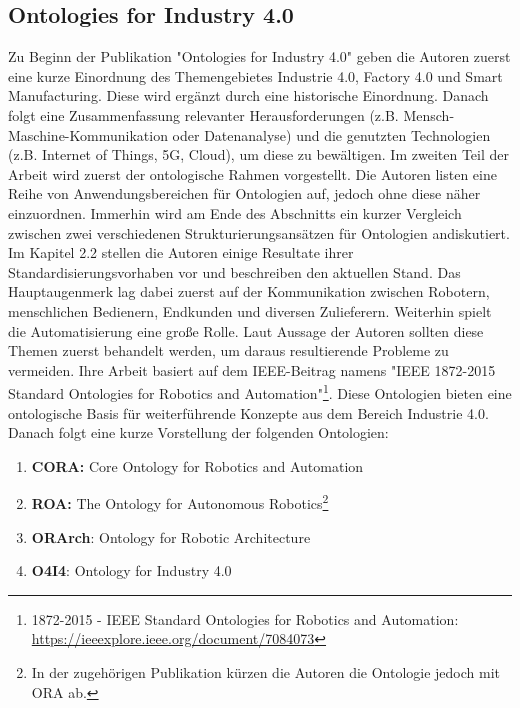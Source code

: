 \documentclass{article}
\begin{document}
\subsection{Ontologies for Industry 4.0}
%

Zu Beginn der Publikation "Ontologies for Industry 4.0" \cite{kumar2019ontologies} geben die Autoren zuerst eine kurze Einordnung des Themengebietes Industrie 4.0, Factory 4.0 und Smart Manufacturing.
Diese wird ergänzt durch eine historische Einordnung.
Danach folgt eine Zusammenfassung relevanter Herausforderungen (z.B. Mensch-Maschine-Kommunikation oder Datenanalyse) und die genutzten Technologien (z.B. Internet of Things, 5G, Cloud), um diese zu bewältigen.
Im zweiten Teil der Arbeit wird zuerst der ontologische Rahmen vorgestellt.
Die Autoren listen eine Reihe von Anwendungsbereichen für Ontologien auf, jedoch ohne diese näher einzuordnen.
Immerhin wird am Ende des Abschnitts ein kurzer Vergleich zwischen zwei verschiedenen Strukturierungsansätzen für Ontologien andiskutiert.
Im Kapitel 2.2 stellen die Autoren einige Resultate ihrer Standardisierungsvorhaben vor und beschreiben den aktuellen Stand.
Das Hauptaugenmerk lag dabei zuerst auf der Kommunikation zwischen Robotern, menschlichen Bedienern, Endkunden und diversen Zulieferern.
Weiterhin spielt die Automatisierung eine große Rolle.
Laut Aussage der Autoren sollten diese Themen zuerst behandelt werden, um daraus resultierende Probleme zu vermeiden.
Ihre Arbeit basiert auf dem IEEE-Beitrag namens "IEEE 1872-2015 Standard Ontologies for Robotics and Automation"\footnote{1872-2015 - IEEE Standard Ontologies for Robotics and Automation: \url{https://ieeexplore.ieee.org/document/7084073}}.
Diese Ontologien bieten eine ontologische Basis für weiterführende Konzepte aus dem Bereich Industrie 4.0.
Danach folgt eine kurze Vorstellung der folgenden Ontologien:
\begin{enumerate}
    \item \textbf{CORA:} Core Ontology for Robotics and Automation
    \item \textbf{ROA:} The Ontology for Autonomous Robotics\footnote{In der zugehörigen Publikation\cite{olszewska2017ontology} kürzen die Autoren die Ontologie jedoch mit ORA ab.}
    \item \textbf{ORArch}: Ontology for Robotic Architecture
    \item \textbf{O4I4}: Ontology for Industry 4.0
\end{enumerate}
\end{document}
